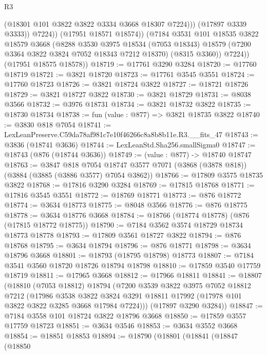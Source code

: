 \begin{lexlean}{R3}
\begin{coremodule}
                    (@18301 @101 @3822 @3822 @3334 @3668 @18307 @7224)))
                (@17897 @3339 @3333))
              @7224))
          (@17951 @18571 @18574))
        (@7184
          @3531
          @101
          @18535
          @3822
          @18579
          @3668
          (@8288
            @3530
            @3975
            @18534
            (@7053 @18343)
            @18579
            (@7200 @3364 @3822 @3824 @7052 @18343 @7212 @18370)
            (@8315 @3360))
          @7224))
      (@17951 @18575 @18578))
@18719 := @17761 @3290 @3284
@18720 := @17760 @18719
@18721 := @3821 @18720
@18723 := @17761 @3545 @3551
@18724 := @17760 @18723
@18726 := @3821 @18724 @3822
@18727 := @18721 @18726
@18729 := @3821 @18727 @3822
@18730 := @3821 @18729
@18731 := @8038 @3566
@18732 := @3976 @18731
@18734 := @3821 @18732 @3822
@18735 := @18730 @18734
@18738 := fun (value : @877) => @3821 @18735 @3822
@18740 := @3830 @818 @7054
@18741 := LexLeanPreserve.C59da78af981c7e10f46266c8a8b8b11e.R3.__fits_47
@18743 := @3836 (@18741 @3636)
@18744 := LexLeanStd.Sha256.smallSigma0
@18747 := @18743 (@876 (@18744 @3636))
@18749 := (value : @877) -> @18740 @18747
@18763 := @3847
    @818
    @7054
    @18747
    @3577
    @7071
    (@3868 (@3878 @818))
    (@3884 (@3885 (@3886 @3577) @7054 @3862))
@18766 := @17809 @3575 @18735 @3822
@18768 := @17816 @3290 @3284
@18769 := @17815 @18768
@18771 := @17816 @3545 @3551
@18772 := @18769 @18771
@18773 := @876 @18772
@18774 := @3634 @18773
@18775 := @8048 @3566
@18776 := @876 @18775
@18778 := @3634 @18776 @3668
@18784 := @18766 (@18774 @18778) (@876 (@17815 @18772 @18775))
@18790 := @7184 @3562 @3574 @18729 @18734 @18773 @18778
@18793 := @17809 @3561 @18727 @3822
@18794 := @876 @18768
@18795 := @3634 @18794
@18796 := @876 @18771
@18798 := @3634 @18796 @3668
@18801 := @18793 (@18795 @18798) @18773
@18807 := @7184 @3541 @3560 @18720 @18726 @18794 @18798
@18810 := @17859 @3540 @17759 @18719
@18811 := @17965 @3668
@18812 := @17966 @18811
@18841 := @18807
    (@18810
      (@7053 @18812)
      @18794
      (@7200
        @3539
        @3822
        @3975
        @7052
        @18812
        @7212
        (@17986
          @3538
          @3822
          @3824
          @3291
          @18811
          @17992
          (@17978 @101 @3822 @3822 @3285 @3668 @17984 @7224)))
      (@17897 @3290 @3284))
@18847 := @7184 @3558 @101 @18724 @3822 @18796 @3668
@18850 := @17859 @3557 @17759 @18723
@18851 := @3634 @3546
@18853 := @3634 @3552 @3668
@18854 := @18851 @18853
@18894 := @18790
    (@18801
      (@18841
        (@18847
          (@18850

\end{coremodule}
\end{lexlean}
